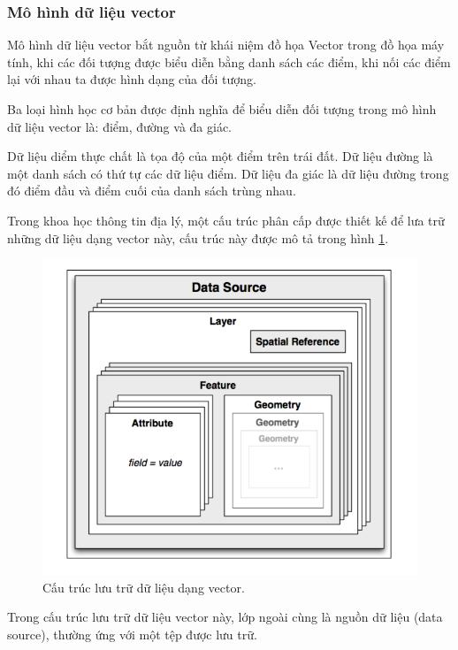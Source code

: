 \documentclass[14pt, oneside, a4paper, openany]{scrartcl}
\begin{document}
\subsubsection{Mô hình dữ liệu vector}
Mô hình dữ liệu vector bắt nguồn từ khái niệm đồ họa Vector trong đồ họa máy tính, khi các đối tượng được biểu diễn bằng danh sách các điểm, khi nối các điểm lại với nhau ta được hình dạng của đối tượng.

Ba loại hình học cơ bản được định nghĩa để biểu diễn đối tượng trong mô hình dữ liệu vector là: điểm, đường và đa giác.

Dữ liệu diểm thực chất là tọa độ của một điểm trên trái đất. Dữ liệu đường là một danh sách có thứ tự các dữ liệu điểm. Dữ liệu đa giác là dữ liệu đường trong đó điểm đầu và điểm cuối của danh sách trùng nhau.

Trong khoa học thông tin địa lý, một cấu trúc phân cấp được thiết kế để lưa trữ những dữ liệu dạng vector này, cấu trúc này được mô tả trong hình \ref{fig:vectordata}.

\begin{figure}[!h]
	\centering
	\includegraphics[scale=0.6]{figures/vectordataformat.png} 
	\caption[Cấu trúc lưu trữ dữ liệu dạng vetor.]{Cấu trúc lưu trữ dữ liệu dạng vector\cite{geospatialbook}.}
	\label{fig:vectordata}
\end{figure}

Trong cấu trúc lưu trữ dữ liệu vector này, lớp ngoài cùng là nguồn dữ liệu (data source), thường ứng với một tệp được lưu trữ.
\end{document}

